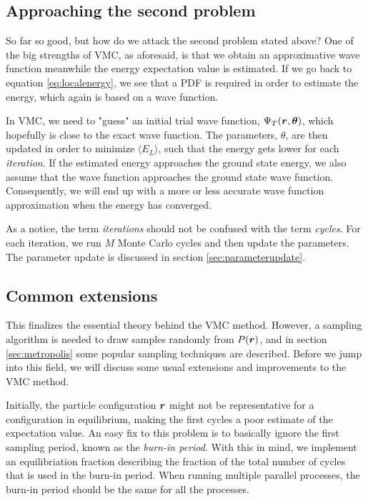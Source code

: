 \subsection{Approaching the second problem}
So far so good, but how do we attack the second problem stated above? One of the big strengths of VMC, as aforesaid, is that we obtain an approximative wave function meanwhile the energy expectation value is estimated. If we go back to equation \eqref{eq:localenergy}, we see that a PDF is required in order to estimate the energy, which again is based on a wave function. 

In VMC, we need to "guess" an initial trial wave function, $\Psi_T(\boldsymbol{{r}},\boldsymbol{{\theta}})$, which hopefully is close to the exact wave function. The parameters, $\theta$, are then updated in order to minimize $\langle E_L\rangle$, such that the energy gets lower for each \textit{iteration}. If the estimated energy approaches the ground state energy, we also assume that the wave function approaches the ground state wave function. Consequently, we will end up with a more or less accurate wave function approximation when the energy has converged. 

As a notice, the term \textit{iterations} should not be confused with the term \textit{cycles}. For each iteration, we run $M$ Monte Carlo cycles and then update the parameters. The parameter update is discussed in section \ref{sec:parameterupdate}.

\subsection{Common extensions}
This finalizes the essential theory behind the VMC method. However, a sampling algorithm is needed to draw samples randomly from $P(\boldsymbol{{r}})$, and in section \ref{sec:metropolis} some popular sampling techniques are described. Before we jump into this field, we will discuss some usual extensions and improvements to the VMC method.

Initially, the particle configuration $\boldsymbol{{r}}$ might not be representative for a configuration in equilibrium, making the first cycles a poor estimate of the expectation value. An easy fix to this problem is to basically ignore the first sampling period, known as the \textit{burn-in period}. With this in mind, we implement an equilibriation fraction describing the fraction of the total number of cycles that is used in the burn-in period. When running multiple parallel processes, the burn-in period should be the same for all the processes.

